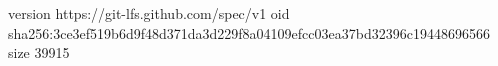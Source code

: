 version https://git-lfs.github.com/spec/v1
oid sha256:3ce3ef519b6d9f48d371da3d229f8a04109efcc03ea37bd32396c19448696566
size 39915
